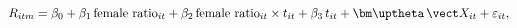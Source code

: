 \begin{equation}\label{equation15}
	R_{itm} =	\beta_0 + \beta_1\,\text{female ratio}_{it} + \beta_2\,\text{female ratio}_{it}\times t_{it} + \beta_3\,t_{it} + \bm\uptheta\,\vect X_{it} + \varepsilon_{it},
\end{equation}